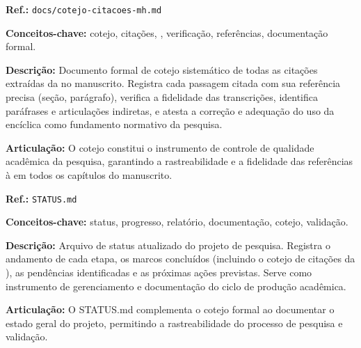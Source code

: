 \begin{fichamento}
    \textbf{Ref.:} \texttt{docs/cotejo-citacoes-mh.md}

    \textbf{Conceitos-chave:} cotejo, citações, \MH{}, verificação, referências, documentação formal.

    \textbf{Descrição:} Documento formal de cotejo sistemático de todas as citações extraídas da \MH{} no manuscrito. Registra cada passagem citada com sua referência precisa (seção, parágrafo), verifica a fidelidade das transcrições, identifica paráfrases e articulações indiretas, e atesta a correção e adequação do uso da encíclica como fundamento normativo da pesquisa.

    \textbf{Articulação:} O cotejo constitui o instrumento de controle de qualidade acadêmica da pesquisa, garantindo a rastreabilidade e a fidelidade das referências à \MH{} em todos os capítulos do manuscrito.
\end{fichamento}

\begin{fichamento}
    \textbf{Ref.:} \texttt{STATUS.md}

    \textbf{Conceitos-chave:} status, progresso, relatório, documentação, cotejo, validação.

    \textbf{Descrição:} Arquivo de status atualizado do projeto de pesquisa. Registra o andamento de cada etapa, os marcos concluídos (incluindo o cotejo de citações da \MH{}), as pendências identificadas e as próximas ações previstas. Serve como instrumento de gerenciamento e documentação do ciclo de produção acadêmica.

    \textbf{Articulação:} O STATUS.md complementa o cotejo formal ao documentar o estado geral do projeto, permitindo a rastreabilidade do processo de pesquisa e validação.
\end{fichamento}

